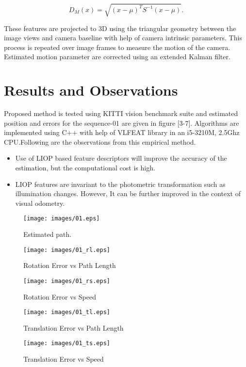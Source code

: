 \documentclass{article}
\begin{document}
\begin{equation}D_M(x) = \sqrt{(x - \mu)^T S^{-1} (x-\mu)}.\end{equation}

These features are projected to 3D using the triangular geometry between the image views and camera baseline with help of camera intrinsic parameters. This process is repeated over image frames to measure the motion of the camera. Estimated motion parameter are corrected using an extended Kalman filter.

\section{Results and Observations}
Proposed method is tested using KITTI vision benchmark suite\cite{Geiger2012CVPR}  and estimated position  and errors for the sequence-01 are given in figure [3-7]. Algorithms are implemented using C++ with help of VLFEAT library in an  i5-3210M, 2.5Ghz CPU.Following are the observations from this empirical method.

\begin{itemize}
\item Use of LIOP based feature descriptors will improve the accuracy of the estimation, but the computational cost is high. 
\item  LIOP features are invariant to the photometric transformation such as illumination changes. However, It can be further improved in the context of visual odometry.
\end{itemize}
\begin{figure}[ht]
 \centering
 \texttt{[image: images/01.eps]}
\caption{Estimated path.}
\label{match}
\end{figure}
\begin{figure}[H]
    \centering
    \begin{minipage}{.5\textwidth}
    
        \centering
        \texttt{[image: images/01\_rl.eps]}
        \vspace{-1.5em}
        \caption{Rotation Error  vs Path Length}
        \label{a}
    \end{minipage}%
    \begin{minipage}{0.5\textwidth}
        \centering
        \texttt{[image: images/01\_rs.eps]}
         \vspace{-1.5em}
        \caption{Rotation Error  vs Speed}
        \label{b}
    \end{minipage}
    \centering
    \begin{minipage}{.5\textwidth}
        \centering
        \texttt{[image: images/01\_tl.eps]}
         \vspace{-1.5em}
        \caption{Translation Error  vs Path Length}
        \label{c}
    \end{minipage}%
    \begin{minipage}{0.5\textwidth}
        \centering
        \texttt{[image: images/01\_ts.eps]}
         \vspace{-1.5em}
        \caption{Translation Error  vs Speed}
        \label{fd}
    \end{minipage}
\end{figure}
\end{document}
